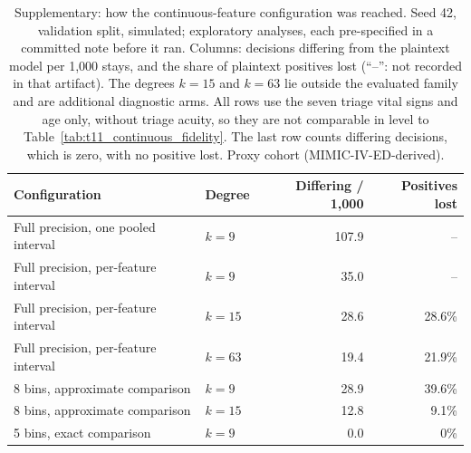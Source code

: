 \begin{table}[t]
\centering
\caption{Supplementary: how the continuous-feature configuration was reached. Seed 42, validation split, simulated; exploratory analyses\added{}, each pre-specified in a committed note before it ran. Columns: decisions differing from the plaintext model per 1,000 stays, and the share of plaintext positives lost (``--'': not recorded in that artifact). The degrees $k=15$ and $k=63$ lie outside the evaluated family and are additional diagnostic arms. All rows use the seven triage vital signs and age only, without triage acuity, so they are not comparable in level to Table~\ref{tab:t11_continuous_fidelity}. The last row counts differing decisions, which is zero, with no positive lost. Proxy cohort (MIMIC-IV-ED-derived).}
\label{tab:s7_pilot_trajectory}
\begin{tabular}{llrr}
\toprule
Configuration & Degree & Differing / 1,000 & Positives lost \\
\midrule
Full precision, one pooled interval & $k=9$ & 107.9 & -- \\
Full precision, per-feature interval & $k=9$ & 35.0 & -- \\
Full precision, per-feature interval & $k=15$ & 28.6 & 28.6\% \\
Full precision, per-feature interval & $k=63$ & 19.4 & 21.9\% \\
8 bins, approximate comparison & $k=9$ & 28.9 & 39.6\% \\
8 bins, approximate comparison & $k=15$ & 12.8 & 9.1\% \\
5 bins, exact comparison & $k=9$ & 0.0 & 0\% \\
\bottomrule
\end{tabular}
\end{table}
